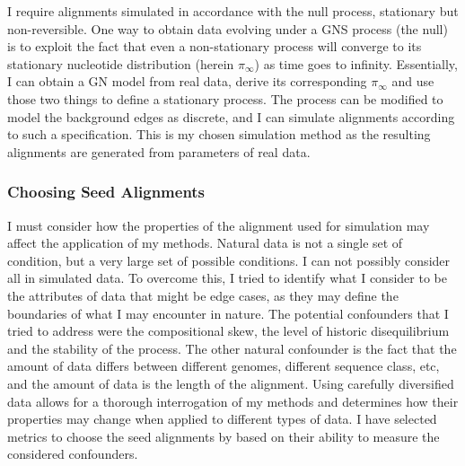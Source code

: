I require alignments simulated in accordance with the null process, stationary but non-reversible. One way to obtain data evolving under a GNS process (the null) is to exploit the fact that even a non-stationary process will converge to its stationary nucleotide distribution (herein $\pi_{\infty}$) as time goes to infinity. Essentially, I can obtain a GN model from real data, derive its corresponding $\pi_{\infty}$ and use those two things to define a stationary process. The process can be modified to model the background edges as discrete, and I can simulate alignments according to such a specification. This is my chosen simulation method as the resulting alignments are generated from parameters of real data. 

\subsubsection{Choosing Seed Alignments}

I must consider how the properties of the alignment used for simulation may affect the application of my methods. Natural data is not a single set of condition, but a very large set of possible conditions. I can not possibly consider all in simulated data. To overcome this, I tried to identify what I consider to be the attributes of data that might be edge cases, as they may define the boundaries of what I may encounter in nature. The potential confounders that I tried to address were the compositional skew, the level of historic disequilibrium and the stability of the process. The other natural confounder is the fact that the amount of data differs between different genomes, different sequence class, etc, and the amount of data is the length of the alignment. Using carefully diversified data allows for a thorough interrogation of my methods and determines how their properties may change when applied to different types of data. I have selected metrics to choose the seed alignments by based on their ability to measure the considered confounders. 

